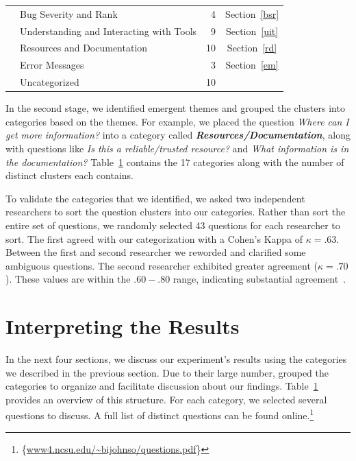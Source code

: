 \documentclass[conference]{IEEEtran}
\newcommand{\blind}[1]{{\color{white}\{#1\}}}
\begin{document}
\begin{table}
\begin{tabular}{|l|l|r|c|}
    									& Bug Severity and Rank											& 4     		& Section~\ref{bsr}		\\

    									& Understanding and Interacting with Tools						& 9     		& Section~\ref{uit}			\\

   	 									& Resources and Documentation									& 10     		& Section~\ref{rd}		\\

    									& Error Messages												& 3     		& Section~\ref{em}		\\
    \hline	
       									& Uncategorized													& 10    		&			 \\
    \hline
\end{tabular}
\label{table:categories}
\end{table}


In the second stage, we identified emergent themes and grouped the clusters into categories based on the themes. 
For example, we placed the question \textit{Where can I get more information?} into a category called \emph{\textbf{Resources/Documentation}}, along with questions like \textit{Is this a reliable/trusted resource?} and \textit{What information is in the documentation?} 
Table~\ref{table:categories} contains the 17 categories along with the number of distinct clusters each contains. 

To validate the categories that we identified, we asked two independent researchers to sort the question clusters into our categories. 
Rather than sort the entire set of questions, we randomly selected 43 questions for each researcher to sort.
The first agreed with our categorization with a Cohen's Kappa of $\kappa = .63$. 
Between the first and second researcher we reworded and clarified some ambiguous questions. The second researcher exhibited greater agreement ($\kappa = .70$). 
These values are within the $.60 - .80$ range, indicating substantial agreement~\cite{Landis1977agreement}.

\section{Interpreting the Results}
\label{sec:results}

In the next four sections, we discuss our experiment's results using the categories we described in the previous section.
Due to their large number, grouped the categories to organize and facilitate discussion about our findings. 
Table~\ref{table:categories} provides an overview of this structure.
For each category, we selected several questions to discuss. A full list of distinct questions can be found online.\footnote{\blind{\url{www4.ncsu.edu/~bijohnso/questions.pdf}}}
\end{document}
